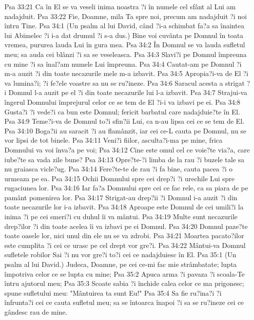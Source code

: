 Psa 33:21  Ca în El se va veseli inima noastra ?i în numele cel sfânt al Lui am nadajduit.
Psa 33:22  Fie, Doamne, mila Ta spre noi, precum am nadajduit ?i noi întru Tine.
Psa 34:1  (Un psalm al lui David, când ?i-a schimbat fa?a sa înaintea lui Abimelec ?i i-a dat drumul ?i s-a dus.) Bine voi cuvânta pe Domnul în toata vremea, pururea lauda Lui în gura mea.
Psa 34:2  În Domnul se va lauda sufletul meu; sa auda cei blânzi ?i sa se veseleasca.
Psa 34:3  Slavi?i pe Domnul împreuna cu mine ?i sa înal?am numele Lui împreuna.
Psa 34:4  Cautat-am pe Domnul ?i m-a auzit ?i din toate necazurile mele m-a izbavit.
Psa 34:5  Apropia?i-va de El ?i va lumina?i; ?i fe?ele voastre sa nu se ru?ineze.
Psa 34:6  Saracul acesta a strigat ?i Domnul l-a auzit pe el ?i din toate necazurile lui l-a izbavit.
Psa 34:7  Strajui-va îngerul Domnului împrejurul celor ce se tem de El ?i-i va izbavi pe ei.
Psa 34:8  Gusta?i ?i vede?i ca bun este Domnul; fericit barbatul care nadajduie?te în El.
Psa 34:9  Teme?i-va de Domnul to?i sfin?ii Lui, ca n-au lipsa cei ce se tem de El.
Psa 34:10  Boga?ii au saracit ?i au flamânzit, iar cei ce-L cauta pe Domnul, nu se vor lipsi de tot binele.
Psa 34:11  Veni?i fiilor, asculta?i-ma pe mine, frica Domnului va voi înva?a pe voi;
Psa 34:12  Cine este omul cel ce voie?te via?a, care iube?te sa vada zile bune?
Psa 34:13  Opre?te-?i limba de la rau ?i buzele tale sa nu graiasca vicle?ug.
Psa 34:14  Fere?te-te de rau ?i fa bine, cauta pacea ?i o urmeaza pe ea.
Psa 34:15  Ochii Domnului spre cei drep?i ?i urechile Lui spre rugaciunea lor.
Psa 34:16  Iar fa?a Domnului spre cei ce fac rele, ca sa piara de pe pamânt pomenirea lor.
Psa 34:17  Strigat-au drep?ii ?i Domnul i-a auzit ?i din toate necazurile lor i-a izbavit.
Psa 34:18  Aproape este Domnul de cei umili?i la inima ?i pe cei smeri?i cu duhul îi va mântui.
Psa 34:19  Multe sunt necazurile drep?ilor ?i din toate acelea îi va izbavi pe ei Domnul.
Psa 34:20  Domnul paze?te toate oasele lor, nici unul din ele nu se va zdrobi.
Psa 34:21  Moartea pacato?ilor este cumplita ?i cei ce urasc pe cel drept vor gre?i.
Psa 34:22  Mântui-va Domnul sufletele robilor Sai ?i nu vor gre?i to?i cei ce nadajduiesc în El.
Psa 35:1  (Un psalm al lui David.) Judeca, Doamne, pe cei ce-mi fac mie strâmbatate; lupta împotriva celor ce se lupta cu mine;
Psa 35:2  Apuca arma ?i pavaza ?i scoala-Te întru ajutorul meu;
Psa 35:3  Scoate sabia ?i închide calea celor ce ma prigonesc; spune sufletului meu: "Mântuirea ta sunt Eu!"
Psa 35:4  Sa fie ru?ina?i ?i înfrunta?i cei ce cauta sufletul meu; sa se întoarca înapoi ?i sa se ru?ineze cei ce gândesc rau de mine.
